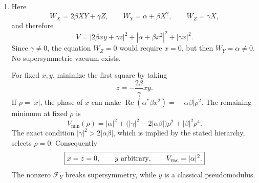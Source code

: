 \begin{enumerate}
\begin{enumerate}
\begin{enumerate}
      \item[(iii)] Here
      \[
        W_X=2\beta XY+\gamma Z,\qquad
        W_Y=\alpha+\beta X^2,\qquad
        W_Z=\gamma X,
      \]
      and therefore
      \[
        V=|2\beta xy+\gamma z|^2
          +|\alpha+\beta x^2|^2+|\gamma x|^2.
      \]
      Since \(\gamma\ne0\), the equation \(W_Z=0\) would require \(x=0\),
      but then \(W_Y=\alpha\ne0\).  No supersymmetric vacuum exists.

      For fixed \(x,y\), minimize the first square by taking
      \[
        z=-\frac{2\beta}{\gamma}xy.
      \]
      If \(\rho=|x|\), the phase of \(x\) can make
      \(\operatorname{Re}(\alpha^*\beta x^2)=-|\alpha\beta|\rho^2\).
      The remaining minimum at fixed \(\rho\) is
      \[
        V_{\min}(\rho)=|\alpha|^2
          +\bigl(|\gamma|^2-2|\alpha\beta|\bigr)\rho^2
          +|\beta|^2\rho^4.
      \]
      The exact condition \(|\gamma|^2>2|\alpha\beta|\), which is implied by
      the stated hierarchy, selects \(\rho=0\).  Consequently
      \[
        \boxed{
        x=z=0,\qquad y\ \hbox{arbitrary},\qquad
        V_{\rm vac}=|\alpha|^2.}
      \]
      The nonzero \(\mathcal F_Y\) breaks supersymmetry, while \(y\) is a classical
      pseudomodulus.
    \end{enumerate}
  \end{enumerate}

\end{enumerate}
